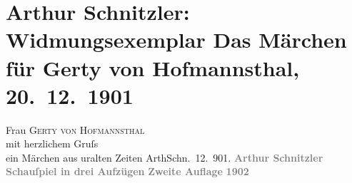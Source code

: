 

         
         \renewcommand{\erwaehntePersonen}{Personen: Hugo von Hofmannsthal, Gertrude von Hofmannsthal}
         \renewcommand{\erwaehnteInstitutionen}{Institutionen: S. Fischer Verlag}
         \renewcommand{\erwaehnteOrte}{Orte: Berlin, Wien}
         \renewcommand{\erwaehnteWerke}{Werke: Das Märchen. Schauspiel in drei Aufzügen}
               \section[Arthur Schnitzler: Widmungsexemplar Das Märchen für Gerty von Hofmannsthal, 20. 12. 1901]{ Arthur Schnitzler: Widmungsexemplar Das Märchen für Gerty von
               Hofmannsthal, 20. 12. 1901}\nopagebreak{}\rehead{ }\begin{ledgroupsized}[t]{13cm}\normalsize\beginnumbering \toendnotes[C]{\smallbreak\pagebreak[2]} 
\pstart
           \noindent{}{\pb}Frau \textsc{Gerty von
                  Hofmannsthal}{\\}mit herzlichem Gruſs{\\}ein Märchen aus uralten Zeiten\pend
           \pstart \spacefill\mbox{ArthSchn}\pend{}. 12. 901.\pend
           {\bigskip}\pstart
           \noindent{}\centering{}{\pb}\textcolor{gray}{\textbf{\textbf{Arthur Schnitzler}}}\pend
           \pstart
           \noindent{}\centering{}\textcolor{gray}{\textbf{\textbf{}}}\pend
           \pstart
           \noindent{}\centering{}\textcolor{gray}{\textbf{Schauſpiel in drei Aufzügen}}\pend
           \pstart
           \noindent{}\centering{}\textcolor{gray}{\textbf{Zweite Auflage}}\pend
           {\bigskip}\pstart
           \noindent{}\centering{}\textcolor{gray}{\textbf{1902}}\pend
           \pstart
           \noindent{}\centering{}\textcolor{gray}{\textbf{}}\pend
           
         
         \endnumbering{}\end{ledgroupsized}  \newcommand{\dateiname}{L01190}\newcommand{\titel}{Arthur Schnitzler: Widmungsexemplar Das Märchen für Gerty von Hofmannsthal, 20. 12. 1901}\newcommand{\editorInnen}{Martin Anton Müller und Gerd-Hermann Susen}
      